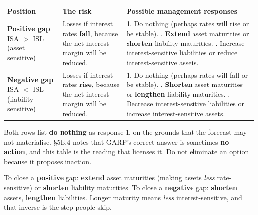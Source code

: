 \begin{lrkeybox}
\begin{center}
\scriptsize
\begin{tabularx}{0.97\textwidth}{@{}p{2.9cm} p{3.4cm} X@{}}
\toprule
\rowcolor{FRMSoft}\textbf{Position} & \textbf{The risk} & \textbf{Possible management responses} \\
\midrule
\textbf{Positive gap} \newline ISA $>$ ISL (asset sensitive) &
Losses if interest rates \textbf{fall}, because the net interest margin will be reduced. &
1. Do nothing (perhaps rates will rise or be stable). \newline
2. \textbf{Extend} asset maturities or \textbf{shorten} liability maturities. \newline
3. Increase interest-sensitive liabilities or reduce interest-sensitive assets. \\
\addlinespace
\textbf{Negative gap} \newline ISA $<$ ISL (liability sensitive) &
Losses if interest rates \textbf{rise}, because the net interest margin will be reduced. &
1. Do nothing (perhaps rates will fall or be stable). \newline
2. \textbf{Shorten} asset maturities or \textbf{lengthen} liability maturities. \newline
3. Decrease interest-sensitive liabilities or increase interest-sensitive assets. \\
\bottomrule
\end{tabularx}
\end{center}
\end{lrkeybox}

\begin{lrtrapbox}
Both rows list \textbf{do nothing} as response 1, on the grounds that the forecast may not materialise. \S5B.4 notes that GARP's correct answer is sometimes \textbf{no action}, and this table is the reading that licenses it. Do not eliminate an option because it proposes inaction.
\end{lrtrapbox}

\begin{lrtrapbox}
To close a \textbf{positive} gap: \textbf{extend} asset maturities (making assets \emph{less} rate-sensitive) or \textbf{shorten} liability maturities. To close a \textbf{negative} gap: \textbf{shorten} assets, \textbf{lengthen} liabilities. Longer maturity means \emph{less} interest-sensitive, and that inverse is the step people skip.
\end{lrtrapbox}

